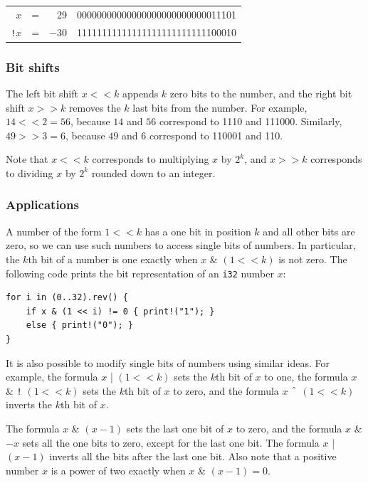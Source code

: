 \begin{center}
\begin{tabular}{rrrr}
$x$ & = & 29 &   00000000000000000000000000011101 \\
\texttt{!}$x$ & = & $-30$ & 11111111111111111111111111100010 \\
\end{tabular}
\end{center}

\subsubsection{Bit shifts}


The left bit shift $x < < k$ appends $k$
zero bits to the number,
and the right bit shift $x > > k$
removes the $k$ last bits from the number.
For example, $14 < < 2 = 56$,
because $14$ and $56$ correspond to 1110 and 111000.
Similarly, $49 > > 3 = 6$,
because $49$ and $6$ correspond to 110001 and 110.

Note that $x < < k$
corresponds to multiplying $x$ by $2^k$,
and $x > > k$
corresponds to dividing $x$ by $2^k$
rounded down to an integer.

\subsubsection{Applications}

A number of the form $1 < < k$ has a one bit
in position $k$ and all other bits are zero,
so we can use such numbers to access single bits of numbers.
In particular, the $k$th bit of a number is one
exactly when $x$ \& $(1 < < k)$ is not zero.
The following code prints the bit representation
of an \texttt{i32} number $x$:

\begin{lstlisting}
for i in (0..32).rev() {
    if x & (1 << i) != 0 { print!("1"); }
    else { print!("0"); }
}
\end{lstlisting}

It is also possible to modify single bits
of numbers using similar ideas.
For example, the formula $x$ | $(1 < < k)$
sets the $k$th bit of $x$ to one,
the formula
$x$ \& \texttt{!} $(1 < < k)$
sets the $k$th bit of $x$ to zero,
and the formula
$x$ $\XOR$ $(1 < < k)$
inverts the $k$th bit of $x$.

The formula $x$ \& $(x-1)$ sets the last
one bit of $x$ to zero,
and the formula $x$ \& $-x$ sets all the
one bits to zero, except for the last one bit.
The formula $x$ | $(x-1)$
inverts all the bits after the last one bit.
Also note that a positive number $x$ is
a power of two exactly when $x$ \& $(x-1) = 0$.

